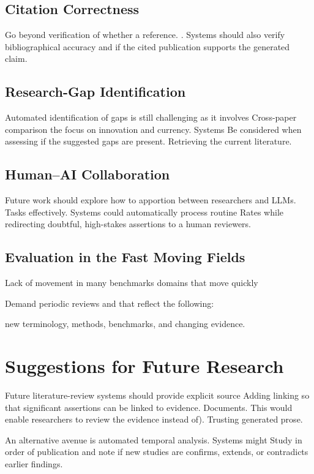 \documentclass[acmsmall,screen]{acmart}
\begin{document}
\subsection{Citation Correctness}

Go beyond verification of whether a reference.
. Systems should also verify bibliographical accuracy and if
the cited publication supports the generated claim.

\subsection{Research-Gap Identification}

Automated identification of gaps is still challenging as it involves
Cross-paper comparison the focus on innovation and currency. Systems
Be considered when assessing if the suggested gaps are present.
Retrieving the current literature.

\subsection{Human--AI Collaboration}

Future work should explore how to apportion between researchers and LLMs.
Tasks effectively. Systems could automatically process routine
Rates while redirecting doubtful, high-stakes assertions to a human
reviewers.

\subsection{Evaluation in the Fast Moving Fields}

Lack of movement in many benchmarks domains that move quickly

Demand periodic reviews and that reflect the following:

new terminology, methods, benchmarks, and changing evidence.

\section{Suggestions for Future Research}

Future literature-review systems should provide explicit source
Adding linking so that significant assertions can be linked to evidence.
Documents. This would enable researchers to review the evidence instead of).
Trusting generated prose.

An alternative avenue is automated temporal analysis. Systems might
Study in order of publication and note if new studies are
confirms, extends, or contradicts earlier findings.
\end{document}
